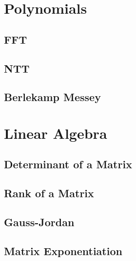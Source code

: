 \documentclass[10pt]{article}
\begin{document}
\begin{multicols*}{2}

\section{Polynomials}

\subsection{FFT}


\subsection{NTT}


\subsection{Berlekamp Messey}



\section{Linear Algebra}

\subsection{Determinant of a Matrix}


\subsection{Rank of a Matrix}


\subsection{Gauss-Jordan}


\subsection{Matrix Exponentiation}



\end{multicols*}
\end{document}

